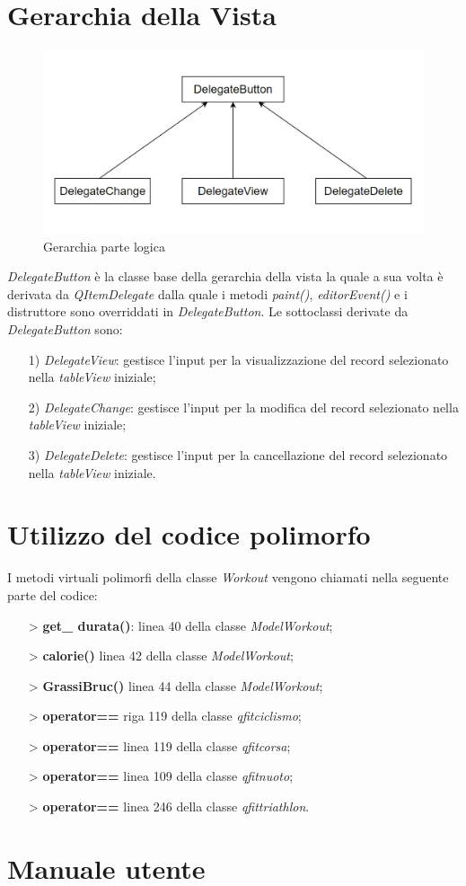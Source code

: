 \documentclass[12pt, a4paper]{article}
\begin{document}
\section{Gerarchia della Vista}
\begin{figure}[H]
	\centering
	
	\includegraphics[scale=0.45]{img/viewGraph.jpg}
	\caption{Gerarchia parte logica}
\end{figure}
\emph{DelegateButton} è la classe base della gerarchia della vista la quale a sua volta è derivata da \emph{QItemDelegate} dalla quale i metodi \emph{paint()}, \emph{editorEvent()} e i distruttore sono overriddati  in \emph{DelegateButton}. Le sottoclassi derivate da \emph{DelegateButton} sono:
\begin{itemize}
\item[1)]\emph{DelegateView}:  gestisce l'input per la visualizzazione del record selezionato nella \emph{tableView} iniziale;
\item[2)]\emph{DelegateChange}: gestisce l'input per la modifica del record selezionato nella \emph{tableView} iniziale;
\item[3)]\emph{DelegateDelete}:  gestisce l'input per la cancellazione del record selezionato nella \emph{tableView} iniziale.
\end{itemize} 


\section{Utilizzo del codice polimorfo}

I metodi virtuali polimorfi della classe \emph{Workout} vengono chiamati nella seguente parte del codice:
\begin{itemize}
\item[\textgreater] \textbf{get\_ durata()}: linea 40 della classe \emph{ModelWorkout};
\item[\textgreater] \textbf{calorie()} linea 42 della classe \emph{ModelWorkout};
\item[\textgreater] \textbf{GrassiBruc()} linea 44 della classe \emph{ModelWorkout};
\item[\textgreater] \textbf{operator==} riga 119 della classe \emph{qfitciclismo};
\item[\textgreater] \textbf{operator==} linea 119 della classe \emph{qfitcorsa};
\item[\textgreater] \textbf{operator==} linea 109 della classe \emph{qfitnuoto};
\item[\textgreater] \textbf{operator==} linea 246 della classe \emph{qfittriathlon}.
\end{itemize}
\section{Manuale utente}
\end{document}
